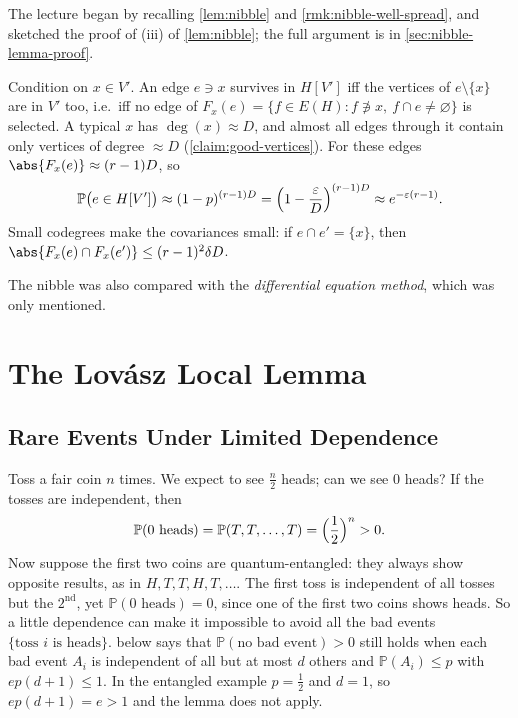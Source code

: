 
The lecture began by recalling \autoref{lem:nibble} and \autoref{rmk:nibble-well-spread}, and sketched the proof of (iii) of \autoref{lem:nibble}; the full argument is in \autoref{sec:nibble-lemma-proof}.

\begin{remark}\label{rmk:nibble-iii-sketch}
    Condition on \(x \in V'\). An edge \(e \ni x\) survives in \(H[V']\) iff the vertices of \(e \setminus \{x\}\) are in \(V'\) too, i.e.\ iff no edge of \(F_{x}(e) = \{ f \in E(H) : f \not\ni x,\ f \cap e \ne \varnothing \}\) is selected. A typical \(x\) has \(\deg(x) \approx D\), and almost all edges through it contain only vertices of degree \(\approx D\) (\autoref{claim:good-vertices}). For these edges \(\abs{F_{x}(e)} \approx (r-1)D\), so
    \[
        \mathbb{P}\bigl( e \in H[V'] \bigr) \approx (1 - p)^{(r-1)D} = \Bigl( 1 - \frac{\varepsilon}{D} \Bigr)^{(r-1)D} \approx e^{-\varepsilon(r-1)} .
    \]
    Small codegrees make the covariances small: if \(e \cap e' = \{x\}\), then \(\abs{F_{x}(e) \cap F_{x}(e')} \le (r-1)^{2} \delta D\).
\end{remark}

The nibble was also compared with the \emph{differential equation method}, which was only mentioned.

\chapter{The Lov\'asz Local Lemma}

\section{Rare Events Under Limited Dependence}\label{sec:lll-motivation}

Toss a fair coin \(n\) times. We expect to see \(\frac{n}{2}\) heads; can we see \(0\) heads? If the tosses are independent, then
\[
    \mathbb{P}(0 \text{ heads}) = \mathbb{P}(T, T, \ldots, T) = \Bigl( \frac{1}{2} \Bigr)^{n} > 0 .
\]
Now suppose the first two coins are quantum-entangled: they always show opposite results, as in \(H, T, T, H, T, \ldots\). The first toss is independent of all tosses but the \(2^{\text{nd}}\), yet \(\mathbb{P}(0 \text{ heads}) = 0\), since one of the first two coins shows heads. So a little dependence can make it impossible to avoid all the bad events \(\{\text{toss } i \text{ is heads}\}\).  below says that \(\mathbb{P}(\text{no bad event}) > 0\) still holds when each bad event \(A_{i}\) is independent of all but at most \(d\) others and \(\mathbb{P}(A_{i}) \le p\) with \(e p (d+1) \le 1\). In the entangled example \(p = \frac{1}{2}\) and \(d = 1\), so \(e p (d+1) = e > 1\) and the lemma does not apply.

